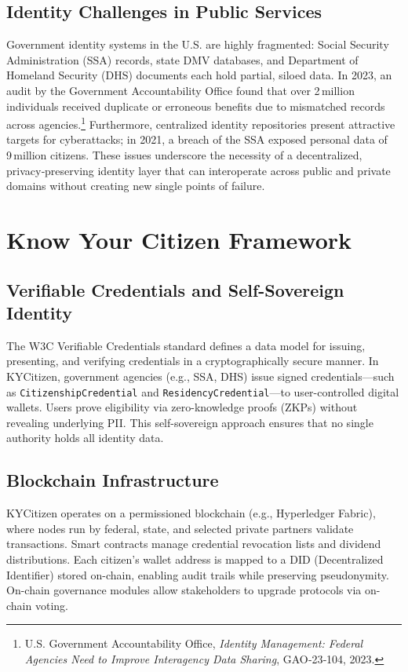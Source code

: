 \documentclass[11pt]{article}
\begin{document}
\subsection{Identity Challenges in Public Services}
Government identity systems in the U.S. are highly fragmented: Social Security Administration (SSA) records, state DMV databases, and Department of Homeland Security (DHS) documents each hold partial, siloed data. In 2023, an audit by the Government Accountability Office found that over 2 million individuals received duplicate or erroneous benefits due to mismatched records across agencies.\footnote{U.S. Government Accountability Office, \emph{Identity Management: Federal Agencies Need to Improve Interagency Data Sharing}, GAO‑23‑104, 2023.} Furthermore, centralized identity repositories present attractive targets for cyberattacks; in 2021, a breach of the SSA exposed personal data of 9 million citizens. These issues underscore the necessity of a decentralized, privacy‐preserving identity layer that can interoperate across public and private domains without creating new single points of failure.

\section{Know Your Citizen Framework}
\subsection{Verifiable Credentials and Self-Sovereign Identity}
The W3C Verifiable Credentials standard defines a data model for issuing, presenting, and verifying credentials in a cryptographically secure manner.\cite{ssi} In KYCitizen, government agencies (e.g., SSA, DHS) issue signed credentials—such as \texttt{CitizenshipCredential} and \texttt{ResidencyCredential}—to user-controlled digital wallets. Users prove eligibility via zero-knowledge proofs (ZKPs) without revealing underlying PII. This self-sovereign approach ensures that no single authority holds all identity data.

\subsection{Blockchain Infrastructure}
KYCitizen operates on a permissioned blockchain (e.g., Hyperledger Fabric), where nodes run by federal, state, and selected private partners validate transactions. Smart contracts manage credential revocation lists and dividend distributions. Each citizen’s wallet address is mapped to a DID (Decentralized Identifier) stored on-chain, enabling audit trails while preserving pseudonymity. On-chain governance modules allow stakeholders to upgrade protocols via on-chain voting.
\end{document}

